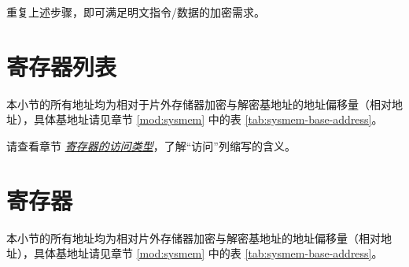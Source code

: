 \documentclass[main\_\_CN.tex]{subfiles}
\begin{document}
重复上述步骤，即可满足明文指令/数据的加密需求。





\clearpage
\section{寄存器列表}
\label{sec:extmemencr-reg-summ}
\hypertarget{extmemencr-reg-summ}{}

本小节的所有地址均为相对于片外存储器加密与解密基地址的地址偏移量（相对地址），具体基地址请见章节 \ref{mod:sysmem} \textit{} 中的表 \ref{tab:sysmem-base-address}。

请查看章节 \hyperref[glossary-access-types]{\textit{寄存器的访问类型}}，了解“访问”列缩写的含义。






\clearpage
\section{寄存器}

本小节的所有地址均为相对片外存储器加密与解密基地址的地址偏移量（相对地址），具体基地址请见章节 \ref{mod:sysmem} \textit{} 中的表 \ref{tab:sysmem-base-address}。


\end{document}
